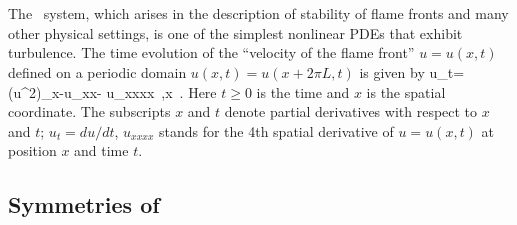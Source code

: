 

\section{\KSe}
\label{s-KS}


The \KS\ system, which
arises in the description of stability of
flame fronts and many other physical settings,
is one of the simplest nonlinear PDEs that
exhibit turbulence.
The time evolution of the ``velocity of the flame front'' 
$u=u(x,t)$ defined on a periodic domain
$u(x,t) = u(x+2\pi L,t)$
is given by
\beq
	u_t=(u^2)_x-u_{xx}- u_{xxxx}
	\,,\qquad	x \in [0,2\pi L]
	\,.
Here $t \geq 0$ is the time and
$x$ is the spatial coordinate.
The subscripts $x$ and $t$ denote partial derivatives with respect to
$x$ and $t$;
$u_t = du/dt$, $u_{xxxx}$ stands for the 4th spatial
derivative of 
$u=u(x,t)$ at position $x$ and time $t$.





\subsection{Symmetries of \KSe}

